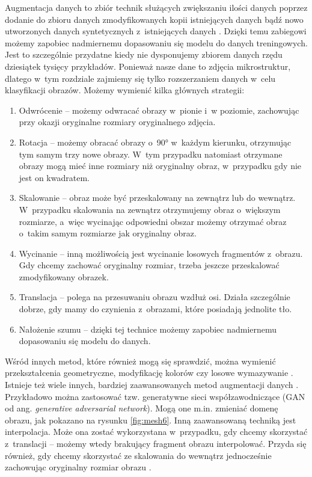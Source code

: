 Augmentacja danych to zbiór technik służących zwiększaniu ilości danych poprzez dodanie do zbioru danych zmodyfikowanych kopii istniejących danych bądź nowo utworzonych danych syntetycznych z~istniejących danych \cite{Shorten19}. Dzięki temu zabiegowi możemy zapobiec nadmiernemu dopasowaniu się modelu do danych treningowych. Jest to szczególnie przydatne kiedy nie dysponujemy zbiorem danych rzędu dziesiątek tysięcy przykładów. Ponieważ nasze dane to zdjęcia mikrostruktur, dlatego w~tym rozdziale zajmiemy się tylko rozszerzaniem danych w~celu klasyfikacji obrazów. Możemy wymienić kilka głównych strategii:

\begin{enumerate}
	\item Odwrócenie – możemy odwracać obrazy w~pionie i~w poziomie, zachowując przy okazji oryginalne rozmiary oryginalnego zdjęcia.

	\item Rotacja – możemy obracać obrazy o~90° w~każdym kierunku, otrzymując tym samym trzy nowe obrazy. W~tym przypadku natomiast otrzymane obrazy mogą mieć inne rozmiary niż oryginalny obraz, w~przypadku gdy nie jest on kwadratem.

	\item Skalowanie – obraz może być przeskalowany na zewnątrz lub do wewnątrz. W~przypadku skalowania na zewnątrz otrzymujemy obraz o~większym rozmiarze, a~więc wycinając odpowiedni obszar możemy otrzymać obraz o~takim samym rozmiarze jak oryginalny obraz.

	\item Wycinanie – inną możliwością jest wycinanie losowych fragmentów z~obrazu. Gdy chcemy zachować oryginalny rozmiar, trzeba jeszcze przeskalować zmodyfikowany obrazek.

	\item Translacja – polega na przesuwaniu obrazu wzdłuż osi. Działa szczególnie dobrze, gdy mamy do czynienia z~obrazami, które posiadają jednolite tło.

	\item Nałożenie szumu – dzięki tej technice możemy zapobiec nadmiernemu dopasowaniu się modelu do danych. 
\end{enumerate}
Wśród innych metod, które również mogą się sprawdzić, można wymienić przekształcenia geometryczne, modyfikację kolorów czy losowe wymazywanie \cite{Shorten19}. Istnieje też wiele innych, bardziej zaawansowanych metod augmentacji danych \cite{Gandhi21}. Przykładowo można zastosować tzw. generatywne sieci współzawodniczące (GAN od ang. \textit{generative adversarial network}). Mogą one m.in. zmieniać domenę obrazu, jak pokazano na rysunku \ref{fig:mesh6}. Inną zaawansowaną techniką jest interpolacja. Może ona zostać wykorzystana w~przypadku, gdy chcemy skorzystać z~translacji – możemy wtedy brakujący fragment obrazu interpolować. Przyda się również, gdy chcemy skorzystać ze skalowania do wewnątrz jednocześnie zachowując oryginalny rozmiar obrazu \cite{Gandhi21}. 

